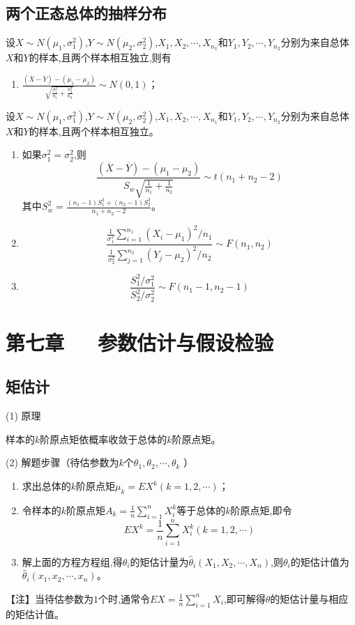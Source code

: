 \documentclass[UTF8]{ctexart}
\theoremstyle{remark}
\begin{document}
		\subsection{两个正态总体的抽样分布}
		设\(X\sim N(\mu_1,\sigma_1^{2})\),\(Y\sim N(\mu_2,\sigma_2^{2})\),\(X_1, X_2, \cdots, X_{n_1}\)和\(Y_1, Y_2, \cdots, Y_{n_2}\)分别为来自总体\(X\)和\(Y\)的样本,且两个样本相互独立,则有
		\begin{enumerate}
			\item \(\frac{(\overline{X}-\overline{Y})-(\mu_1 - \mu_2)}{\sqrt{\frac{\sigma_1^{2}}{n_1}+\frac{\sigma_2^{2}}{n_2}}}\sim N(0,1)\)；
		\end{enumerate}
		
		设\(X \sim N(\mu_1,\sigma_1^{2})\),\(Y \sim N(\mu_2,\sigma_2^{2})\),\(X_1, X_2, \cdots, X_{n_1}\)和\(Y_1, Y_2, \cdots, Y_{n_2}\)分别为来自总体\(X\)和\(Y\)的样本,且两个样本相互独立。
		\begin{enumerate}
			\item 如果\(\sigma_1^{2}=\sigma_2^{2}\),则
			\[
			\frac{(\overline{X}-\overline{Y})-(\mu_1 - \mu_2)}{S_w\sqrt{\frac{1}{n_1}+\frac{1}{n_2}}} \sim t(n_1 + n_2 - 2)
			\]
			其中\(S_w^{2}=\frac{(n_1 - 1)S_1^{2}+(n_2 - 1)S_2^{2}}{n_1 + n_2 - 2}\)。
			\item 
			\[
			\frac{\frac{1}{\sigma_1^{2}}\sum_{i = 1}^{n_1}(X_i - \mu_1)^{2}/n_1}{\frac{1}{\sigma_2^{2}}\sum_{j = 1}^{n_2}(Y_j - \mu_2)^{2}/n_2} \sim F(n_1,n_2)
			\]
			\item 
			\[
			\frac{S_1^{2}/\sigma_1^{2}}{S_2^{2}/\sigma_2^{2}} \sim F(n_1 - 1,n_2 - 1)
			\]
		\end{enumerate}
		\section{第七章~~~参数估计与假设检验}
		\subsection{矩估计}
		(1) 原理
		
		样本的\(k\)阶原点矩依概率收敛于总体的\(k\)阶原点矩。
		
		(2) 解题步骤（待估参数为\(k\)个\(\theta_1,\theta_2,\cdots,\theta_k\) ）
		\begin{enumerate}
			\item 求出总体的\(k\)阶原点矩\(\mu_k = EX^k (k = 1,2,\cdots)\)；
			\item 令样本的\(k\)阶原点矩\(A_k=\frac{1}{n}\sum_{i = 1}^{n}X_i^k\)等于总体的\(k\)阶原点矩,即令
			\[EX^k=\frac{1}{n}\sum_{i = 1}^{n}X_i^k (k = 1,2,\cdots)\]
			\item 解上面的方程方程组,得\(\theta_i\)的矩估计量为\(\hat{\theta}_i(X_1,X_2,\cdots,X_n)\),则\(\theta_i\)的矩估计值为\(\hat{\theta}_i(x_1,x_2,\cdots,x_n)\)。
		\end{enumerate}
		【注】当待估参数为\(1\)个时,通常令\(EX=\frac{1}{n}\sum_{i = 1}^{n}X_i\),即可解得\(\theta\)的矩估计量与相应的矩估计值。
		
\end{document}

